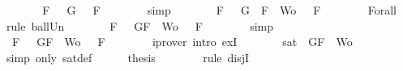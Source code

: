\begin{isabellebody}
\ \ \ \ \isamarkupfalse%
\ \isamarkupfalse%
\ {\isachardoublequoteopen}{\isasymforall}F\ {\isasymin}\ {\isacharbraceleft}\isactrlbold {\isasymnot}\ G{\isacharbraceright}{\isachardot}\ {\isasymA}\ {\isasymTurnstile}\ F{\isachardoublequoteclose}\isanewline
\ \ \ \ \ \ \isamarkupfalse%
\ simp\isanewline
\ \ \ \ \isamarkupfalse%
\ \isamarkupfalse%
\ {\isachardoublequoteopen}{\isasymforall}F\ {\isasymin}\ {\isacharparenleft}{\isacharbraceleft}\isactrlbold {\isasymnot}\ G{\isacharbraceright}\ {\isasymunion}\ {\isacharparenleft}{\isacharbraceleft}F{\isacharbraceright}\ {\isasymunion}\ Wo{\isacharparenright}{\isacharparenright}{\isachardot}\ {\isasymA}\ {\isasymTurnstile}\ F{\isachardoublequoteclose}\isanewline
\ \ \ \ \ \ \isamarkupfalse%
\ Forall{}\ \isamarkupfalse%
\ {\isacharparenleft}rule\ ball{\isacharunderscore}Un{\isacharparenright}\isanewline
\ \ \ \ \isamarkupfalse%
\ \isamarkupfalse%
\ {\isachardoublequoteopen}{\isasymforall}F\ {\isasymin}\ {\isacharbraceleft}\isactrlbold {\isasymnot}\ G{\isacharcomma}F{\isacharbraceright}\ {\isasymunion}\ Wo{\isachardot}\ {\isasymA}\ {\isasymTurnstile}\ F{\isachardoublequoteclose}\isanewline
\ \ \ \ \ \ \isamarkupfalse%
\ simp\isanewline
\ \ \ \ \isamarkupfalse%
\ \isamarkupfalse%
\ {\isachardoublequoteopen}{\isasymexists}{\isasymA}{\isachardot}\ {\isasymforall}F\ {\isasymin}\ {\isacharparenleft}{\isacharbraceleft}\isactrlbold {\isasymnot}\ G{\isacharcomma}F{\isacharbraceright}\ {\isasymunion}\ Wo{\isacharparenright}{\isachardot}\ {\isasymA}\ {\isasymTurnstile}\ F{\isachardoublequoteclose}\isanewline
\ \ \ \ \ \ \isamarkupfalse%
\ {\isacharparenleft}iprover\ intro{\isacharcolon}\ exI{\isacharparenright}\isanewline
\ \ \ \ \isamarkupfalse%
\ \isamarkupfalse%
\ {\isachardoublequoteopen}sat\ {\isacharparenleft}{\isacharbraceleft}\isactrlbold {\isasymnot}\ G{\isacharcomma}F{\isacharbraceright}\ {\isasymunion}\ Wo{\isacharparenright}{\isachardoublequoteclose}\isanewline
\ \ \ \ \ \ \isamarkupfalse%
\ {\isacharparenleft}simp\ only{\isacharcolon}\ sat{\isacharunderscore}def{\isacharparenright}\isanewline
\ \ \ \ \isamarkupfalse%
\ {\isacharquery}thesis\isanewline
\ \ \ \ \ \ \isamarkupfalse%
\ {\isacharparenleft}rule\ disjI{}{\isacharparenright}\isanewline
\ \ \isamarkupfalse%
\isanewline
\ \ \ \ \isamarkupfalse%

\end{isabellebody}
